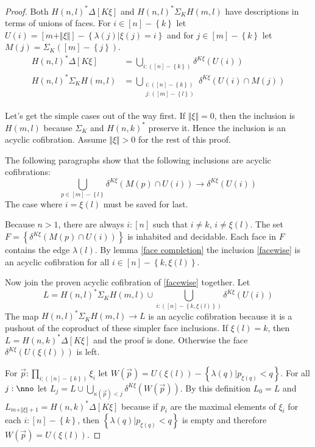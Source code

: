 \documentclass{tac}
\newcommand\set[1]{\left\{#1\right\}}
\newcommand\ri{^*}
\newcommand\of{:}
\newcommand\simplex\Delta
\newcommand\norm[1]{\Vert #1 \Vert}
\newcommand\ka\kappa
\newcommand\la\lambda
\newcommand\depsum{\Sigma_}
\newcommand\face\delta
\newcommand\U{U}
\newcommand\A{M}
\newcommand\W{W}
\begin{document}
\begin{proof} 
Both $H(n,l)\ri\simplex[K\xi]$ and $H(n,l)\ri \depsum K H(m,l)$ have descriptions in terms of unions of faces. For $i\in [n]-\set k$ let $\U(i) = [m+\norm\xi]-\set{\la(j)|\xi(j)=i}$ and for $j\in [m]-\set k$ let $\A(j) = \depsum K([m]-\set j)$.
\begin{align*}
H(n,l)\ri\simplex[K\xi] &= \bigcup_{i\of([n]-\set{k})} \face^{K\xi}(\U(i))\\
H(n,l)\ri \depsum K H(m,l)&= \bigcup_{\substack{i\of([n]-\set{k})\\j\of([m]-\set l)}} \face^{K\xi}(\U(i)\cap \A(j))
\end{align*}

Let's get the simple cases out of the way first. If $\norm\xi = 0$, then the inclusion is $H(m,l)$ because $\depsum K$ and $H(n,k)\ri$ preserve it. Hence the inclusion is an acyclic cofibration. Assume $\norm\xi>0$ for the rest of this proof.

The following paragraphs show that the following inclusions are acyclic cofibrations:
\begin{equation} \bigcup_{p\in[m]-\set l} \face^{K\xi}(\A(p)\cap\U(i))\to \face^{K\xi}(\U(i)) \label{facewise} \end{equation}
The case where $i=\xi(l)$ must be saved for last.

Because $n>1$, there are always $i\of[n]$ such that $i\neq k$, $i\neq \xi(l)$. The set $F = \set{\face^{K\xi}(\A(p)\cap\U(i))}$ is inhabited and decidable. Each face in $F$ contains the edge $\la(l)$. By lemma \ref{face completion} the inclusion \ref{facewise} is an acyclic cofibration for all $i\in [n]-\set{k,\xi(l)}$.

Now join the proven acyclic cofibration of \ref{facewise} together. Let
\[ L=H(n,l)\ri \depsum K H(m,l)\cup\bigcup_{i\of([n]-\set{k,\xi(l)})}\face^{K\xi}(\U(i)) \]
The map $H(n,l)\ri \depsum K H(m,l)\to L$ is an acyclic cofibration because it is a pushout of the coproduct of these simpler face inclusions. If $\xi(l)=k$, then $L=H(n,k)\ri \simplex[K\xi]$ and the proof is done. Otherwise the face $\face^{K\xi}(\U(\xi(l)))$ is left.


For $\vec p \of\prod_{i\of([n]-\set k)}\xi_i$ let $\W(\vec p) = \U(\xi(l))-\set{ \la(q) | p_{\xi(q)} < q }$. For all $j\of\nno$ let $L_j = L\cup \bigcup_{ \ka(\vec p) < j } \face^{K\xi}(\W(\vec p))$. By this definition $L_0=L$ and $L_{m+\norm\xi+1} = H(n,k)\ri\simplex[K\xi]$ because if $p_i$ are the maximal elements of $\xi_i$ for each $i\of[n]-\set k$, then $\set{ \la(q) | p_{\xi(q)} < q }$ is empty and therefore $\W(\vec p) = \U(\xi(l))$.


\end{proof}
\end{document}
